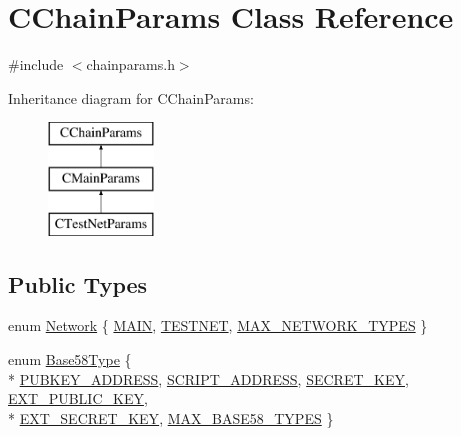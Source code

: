 \hypertarget{class_c_chain_params}{}\section{C\+Chain\+Params Class Reference}
\label{class_c_chain_params}


{\ttfamily \#include $<$chainparams.\+h$>$}

Inheritance diagram for C\+Chain\+Params\+:\begin{figure}[H]
\begin{center}
\leavevmode
\includegraphics[height=3.000000cm]{class_c_chain_params}
\end{center}
\end{figure}
\subsection*{Public Types}
\begin{DoxyCompactItemize}
\item 
enum \hyperlink{class_c_chain_params_a5c4bb1d7c0205399ff06ee58fab7f176}{Network} \{ \hyperlink{class_c_chain_params_a5c4bb1d7c0205399ff06ee58fab7f176ab64dab5901e9dc8c7bf79daf9f7a2e1f}{M\+A\+I\+N}, 
\hyperlink{class_c_chain_params_a5c4bb1d7c0205399ff06ee58fab7f176a7bfe4c44c13adffa9807917840050c60}{T\+E\+S\+T\+N\+E\+T}, 
\hyperlink{class_c_chain_params_a5c4bb1d7c0205399ff06ee58fab7f176ac930c321a94adf771179465e98c13674}{M\+A\+X\+\_\+\+N\+E\+T\+W\+O\+R\+K\+\_\+\+T\+Y\+P\+E\+S}
 \}
\item 
enum \hyperlink{class_c_chain_params_aa294058ec2e3586bd8d03d6c39667058}{Base58\+Type} \{ \\*
\hyperlink{class_c_chain_params_aa294058ec2e3586bd8d03d6c39667058af088724f20c49c73e548f94d8f1808dd}{P\+U\+B\+K\+E\+Y\+\_\+\+A\+D\+D\+R\+E\+S\+S}, 
\hyperlink{class_c_chain_params_aa294058ec2e3586bd8d03d6c39667058adf0172df56140eb2f6fb7a59df0bb76a}{S\+C\+R\+I\+P\+T\+\_\+\+A\+D\+D\+R\+E\+S\+S}, 
\hyperlink{class_c_chain_params_aa294058ec2e3586bd8d03d6c39667058aacf95cbb9b5f51445295c704540adb18}{S\+E\+C\+R\+E\+T\+\_\+\+K\+E\+Y}, 
\hyperlink{class_c_chain_params_aa294058ec2e3586bd8d03d6c39667058a1259eb07831c689e393e5008d7bd0085}{E\+X\+T\+\_\+\+P\+U\+B\+L\+I\+C\+\_\+\+K\+E\+Y}, 
\\*
\hyperlink{class_c_chain_params_aa294058ec2e3586bd8d03d6c39667058ab5636e60152f35f6595fe413eae430b0}{E\+X\+T\+\_\+\+S\+E\+C\+R\+E\+T\+\_\+\+K\+E\+Y}, 
\hyperlink{class_c_chain_params_aa294058ec2e3586bd8d03d6c39667058a6b21a525c7fab64a5df656e708f71a98}{M\+A\+X\+\_\+\+B\+A\+S\+E58\+\_\+\+T\+Y\+P\+E\+S}
 \}
\end{DoxyCompactItemize}
